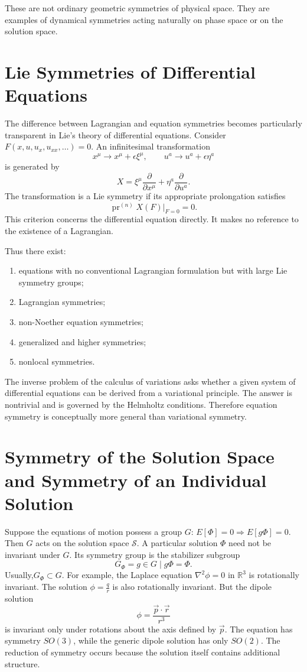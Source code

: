 These are not ordinary geometric symmetries of physical space.  They are
examples of dynamical symmetries acting naturally on phase space or on the
solution space.

\section{ Lie Symmetries of Differential Equations}
\label{sp:lie}

The difference between Lagrangian and equation symmetries becomes particularly
transparent in Lie's theory of differential equations.
Consider $F(x,u,u_x,u_{xx},\ldots)=0$.
An infinitesimal transformation
\[x^\mu\rightarrow x^\mu+\epsilon\xi^\mu,
\qquad
u^a\rightarrow u^a+\epsilon\eta^a
\]
is generated by
\[X=\xi^\mu\frac{\partial}{\partial x^\mu}
+\eta^a\frac{\partial}{\partial u^a}.
\]
The transformation is a Lie symmetry if its appropriate prolongation satisfies
\[\operatorname{pr}^{(n)}X(F)\big|_{F=0}=0.\]
This criterion concerns the differential equation directly.  It makes no
reference to the existence of a Lagrangian.

Thus there exist:
\begin{enumerate}
\item equations with no conventional Lagrangian formulation but with large Lie
    symmetry groups;
\item Lagrangian symmetries;
\item non-Noether equation symmetries;
\item generalized and higher symmetries;
\item nonlocal symmetries.
\end{enumerate}
The inverse problem of the calculus of variations asks whether a given system
of differential equations can be derived from a variational principle.  The
answer is nontrivial and is governed by the Helmholtz conditions.
Therefore equation symmetry is conceptually more general than variational symmetry.

\section{Symmetry of the Solution Space and Symmetry of an Individual Solution}
\label{sp:sol}

Suppose the equations of motion possess a group $G$:
$E[\Phi]=0 \Rightarrow E[g\Phi]=0$.
Then $G$ acts on the solution space $\mathcal{S}$.
A particular solution $\Phi$ need not be invariant under $G$.
Its symmetry group is the stabilizer subgroup
\[G_\Phi={g\in G\mid g\Phi=\Phi}.\]
Usually,$G_\Phi\subset G$.
For example, the Laplace equation
$\nabla^2\phi=0$ in $\mathbb{R}^3$ is rotationally invariant.
The solution $\phi=\tfrac{q}{r}$ is also rotationally invariant.
But the dipole solution
\[\phi=\frac{\vec{p}\cdot\vec{r}}{r^3}\]
is invariant only under rotations about the axis defined by $\vec{p}$.
The equation has symmetry $SO(3)$,
while the generic dipole solution has only $SO(2)$.
The reduction of symmetry occurs because the solution itself contains
additional structure.

